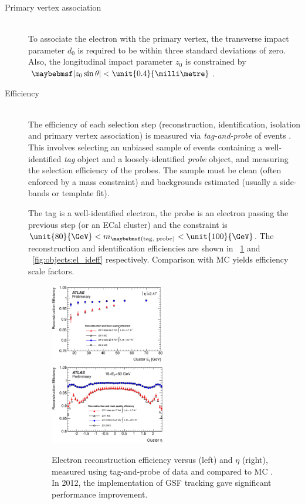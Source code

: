 \begin{description}
\item[Primary vertex association] \hfill \\
	To associate the electron with the primary vertex, the transverse impact parameter 
	$d_0$ is required to be within three standard deviations of zero. Also, the 
	longitudinal impact parameter $z_0$ is constrained by $\mods{z_0 \sin\theta} < 
	\unit{0.4}{\milli\metre}$.

\item[Efficiency] \hfill \\
	The efficiency of each selection step (reconstruction, identification, isolation and 
	primary vertex association) is measured via \textit{tag-and-probe} of 
	\HepProcess{\PZ \HepTo \Pe\Pe} events \cite{ElectronPerf:2010,ElectronPerf:2012}. 
	This involves selecting an unbiased sample of events containing a well-identified 
	\textit{tag} object and a loosely-identified \textit{probe} object, and measuring the 
	selection efficiency of the probes. The sample must be clean (often enforced by a 
	mass constraint) and backgrounds estimated (usually a side-bands or template fit).

	The tag is a well-identified electron, the probe is an electron passing the previous 
	step (or an ECal cluster) and the constraint is $\unit{80}{\GeV} < 
	m_{\parenths{\text{tag, probe}}} < \unit{100}{\GeV}$. The reconstruction and 
	identification efficiencies are shown in \Figure~\ref{fig:objects:el_recoeff} and 
	\Figure~\ref{fig:objects:el_ideff} respectively. Comparison with MC yields efficiency 
	scale factors.

	\begin{figure}
		\includegraphics[width=0.495\textwidth]{tex/selection/el_recoeff_et}
		\hfill
		\includegraphics[width=0.495\textwidth]{tex/selection/el_recoeff_eta}
		\caption{Electron reconstruction efficiency versus \et (left) and $\eta$ (right), 
		measured using tag-and-probe of \HepProcess{\PZ \HepTo \Pe\Pe} data and compared 
		to MC \cite{ElectronPerf:2012}. In 2012, the implementation of GSF tracking gave 
		significant performance improvement.}
		\label{fig:objects:el_recoeff}
	\end{figure}


\end{description}
